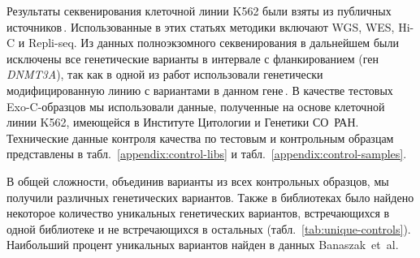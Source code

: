 \documentclass[12pt, twoside, a4paper]{article}
\newcommand{\genename}[1]{\textit{#1}}
\newcommand{\tableref}[1]{табл.~\ref{#1}}
\begin{document}
Результаты секвенирования клеточной линии K562 были взяты из публичных источников\,\citep{Banaszak_2018,Belaghzal_2017,Dixon_2018,Moquin_2017,Rao_2014,Ray_2019,Wang_2020,Zhou_2019}.
Использованные в этих статьях методики включают WGS, WES, Hi-C и Repli-seq.
Из данных полноэкзомного секвенирования в дальнейшем были исключены все генетические варианты в интервале  с фланкированием  (ген \genename{DNMT3A}), так как в одной из работ использовали генетически модифицированную линию с вариантами в данном гене\,\citep{Banaszak_2018}.
В качестве тестовых Exo-C-образцов мы использовали данные, полученные на основе клеточной линии K562, имеющейся в Институте Цитологии и Генетики СО~РАН.
Технические данные контроля качества по тестовым и контрольным образцам представлены в \tableref{appendix:control-libs} и \tableref{appendix:control-samples}.

В общей сложности, объединив варианты из всех контрольных образцов, мы получили  различных генетических вариантов.
Также в библиотеках было найдено некоторое количество уникальных генетических вариантов, встречающихся в одной библиотеке и не встречающихся в остальных (\tableref{tab:unique-controls}).
Наибольший процент уникальных вариантов найден в данных Banaszak~et~al.\,\cite{Banaszak_2018}
\end{document}
